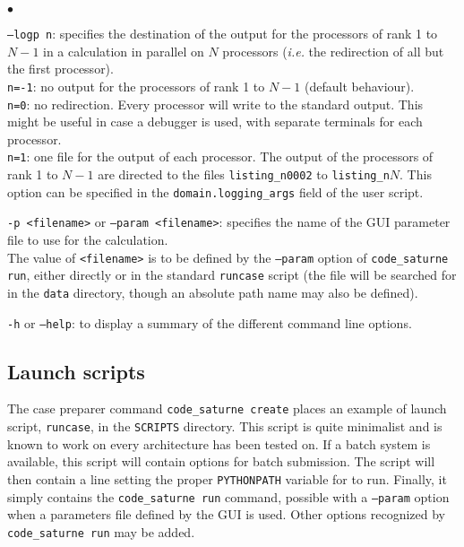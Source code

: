 {{{\begin{list}{$\bullet$}{}
\item \texttt{--logp n}: specifies the destination of the output for the
processors of rank 1 to $N-1$ in a calculation in parallel on $N$ processors
({\em i.e.} the redirection of all but the first processor).\\
\hspace*{0.5cm}\texttt{n=-1}: no output for the processors of rank 1 to $N-1$
(default behaviour).\\
\hspace*{0.5cm}\texttt{n=0}: no redirection. Every processor will write to the
standard output. This might be useful in case a debugger is used, with separate
terminals for each processor.\\
\hspace*{0.5cm}\texttt{n=1}: one file for the output of each processor. The
output of the processors of rank 1 to $N-1$ are directed to the files
\texttt{listing\_n0002} to \texttt{listing\_n$N$}.
This option can be specified in the \texttt{domain.logging\_args} field
of the user script.

\item \texttt{-p <filename>} or \texttt{--param <filename>}: specifies the name of the GUI
parameter file to use for the calculation.\\
The value of \texttt{<filename>} is to be defined by the \texttt{--param} option
of \texttt{code\_saturne run}, either directly or in the standard \texttt{runcase}
script (the file will be searched for in the \texttt{data} directory, though
an absolute path name may also be defined).

\item \texttt{-h} or \texttt{--help}: to display a summary of the different
command line options.
\end{list}

\subsection{Launch scripts}
\label{prg_runcase}%

The case preparer command \texttt{code\_saturne~create} places an example of launch script,
\texttt{runcase}, in the \texttt{SCRIPTS} directory. This script is quite minimalist and is known to work on every architecture \CS has been tested on.
If a batch system is available, this script will contain options
for batch submission.
The script will then contain a line setting the proper \texttt{PYTHONPATH}
variable for \CS to run.
Finally, it simply contains the \texttt{code\_saturne run}  command,
possible with a \texttt{--param} option when a parameters file
defined by the GUI is used. Other options recognized by
\texttt{code\_saturne run} may be added.

}}}
